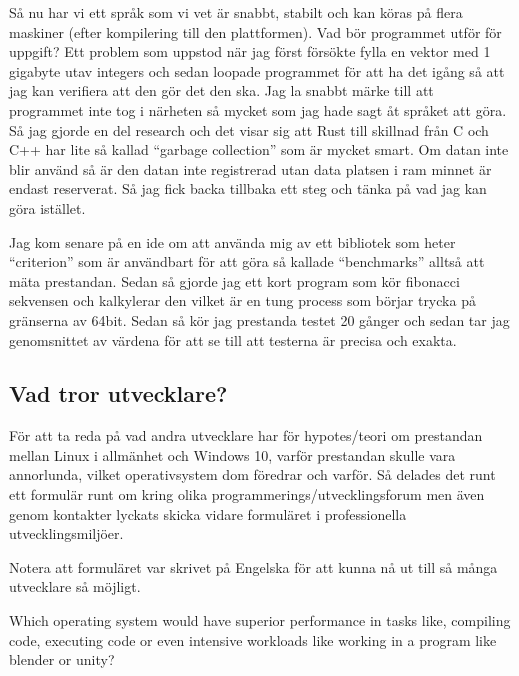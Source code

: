\documentclass[12pt, a4paper]{report}
\begin{document}
 
Så nu har vi ett språk som vi vet är snabbt, stabilt och kan köras på flera maskiner (efter kompilering till den plattformen). Vad bör programmet utför för uppgift? Ett problem som uppstod när jag först försökte fylla en vektor med 1 gigabyte utav integers och sedan loopade programmet för att ha det igång så att jag kan verifiera att den gör det den ska. Jag la snabbt märke till att programmet inte tog i närheten så mycket som jag hade sagt åt språket att göra. Så jag gjorde en del research och det visar sig att Rust till skillnad från C och C++ har lite så kallad ``garbage collection'' som är mycket smart. Om datan inte blir använd så är den datan inte registrerad utan data platsen i ram minnet är endast reserverat. Så jag fick backa tillbaka ett steg och tänka på vad jag kan göra istället.
 
Jag kom senare på en ide om att använda mig av ett bibliotek som heter ``criterion'' som är användbart för att göra så kallade ``benchmarks'' alltså att mäta prestandan. Sedan så gjorde jag ett kort program som kör fibonacci sekvensen och kalkylerar den vilket är en tung process som börjar trycka på gränserna av 64bit. Sedan så kör jag prestanda testet 20 gånger och sedan tar jag genomsnittet av värdena för att se till att testerna är precisa och exakta.
 
 
\subsection{Vad tror utvecklare?}
 
   För att ta reda på vad andra utvecklare har för hypotes/teori om prestandan mellan Linux i allmänhet och Windows 10, varför prestandan skulle vara annorlunda, vilket operativsystem dom föredrar och varför.  Så delades det runt ett formulär runt om kring olika programmerings/utvecklingsforum men även genom kontakter lyckats skicka vidare formuläret i professionella utvecklingsmiljöer.
 
   Notera att formuläret var skrivet på Engelska för att kunna nå ut till så många utvecklare så möjligt.
 
 
   \vspace{2.7cm}
 
 
   \large {Which operating system would have superior performance in tasks like, compiling code, executing code or even intensive workloads like working in a program  like blender or unity?}
 
   \vspace{.5cm}
 
\end{document}
